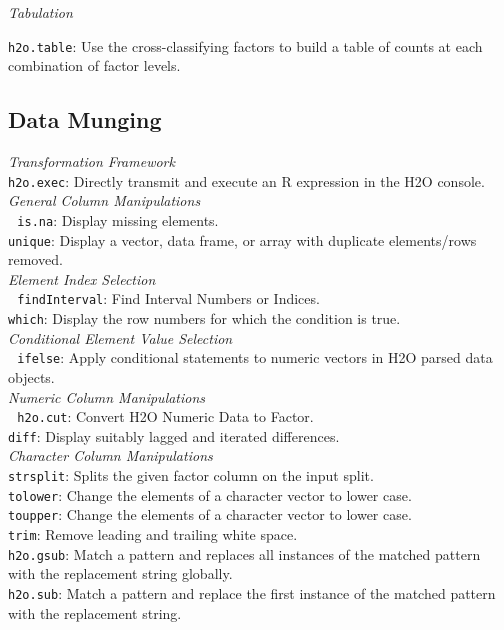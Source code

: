 \documentclass[11pt]{article}
\begin{document}
{{\emph{Tabulation}

{\texttt{h2o.table}}: Use the cross-classifying factors to build a table of counts at each combination of factor levels.\\

\subsection{Data Munging}

\emph{Transformation Framework}\\
{\texttt{h2o.exec}}: Directly transmit and execute an R expression in the H2O console.\\

\emph{General Column Manipulations}\\ 
{\texttt{is.na}}: Display missing elements.  \\
{\texttt{unique}}: Display a vector, data frame, or array with duplicate elements/rows removed.\\

\emph{Element Index Selection}\\ 
{\texttt{findInterval}}: Find Interval Numbers or Indices.\\
{\texttt{which}}: Display the row numbers for which the condition is true.\\

\emph{Conditional Element Value Selection}\\ 
{\texttt{ifelse}}: Apply conditional statements to numeric vectors in H2O parsed data objects.\\

\emph{Numeric Column Manipulations}\\ 
{\texttt{h2o.cut}}: Convert H2O Numeric Data to Factor. \\
{\texttt{diff}}: Display suitably lagged and iterated differences.\\

\emph{Character Column Manipulations}\\
{\texttt{strsplit}}: Splits the given factor column on the input split. \\
{\texttt{tolower}}: Change the elements of a character vector to lower case. \\
{\texttt{toupper}}: Change the elements of a character vector to lower case. \\
{\texttt{trim}}: Remove leading and trailing white space.\\
{\texttt{h2o.gsub}}: Match a pattern and replaces all instances of the matched pattern with the replacement string globally. \\
{\texttt{h2o.sub}}: Match a pattern and replace the first instance of the matched pattern with the replacement string.\\

}}
\end{document}

